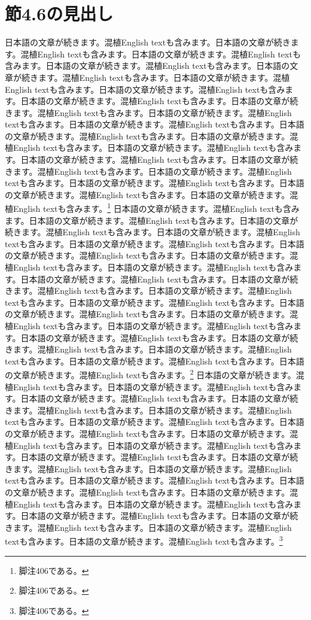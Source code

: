 \documentclass[pdflatex,book]{jlreq}
\begin{document}
\section{節4.6の見出し}
日本語の文章が続きます。混植English textも含みます。日本語の文章が続きます。混植English textも含みます。日本語の文章が続きます。混植English textも含みます。日本語の文章が続きます。混植English textも含みます。日本語の文章が続きます。混植English textも含みます。日本語の文章が続きます。混植English textも含みます。日本語の文章が続きます。混植English textも含みます。日本語の文章が続きます。混植English textも含みます。日本語の文章が続きます。混植English textも含みます。日本語の文章が続きます。混植English textも含みます。日本語の文章が続きます。混植English textも含みます。日本語の文章が続きます。混植English textも含みます。日本語の文章が続きます。混植English textも含みます。日本語の文章が続きます。混植English textも含みます。日本語の文章が続きます。混植English textも含みます。日本語の文章が続きます。混植English textも含みます。日本語の文章が続きます。混植English textも含みます。日本語の文章が続きます。混植English textも含みます。日本語の文章が続きます。混植English textも含みます。日本語の文章が続きます。混植English textも含みます。\footnote{脚注406である。}
日本語の文章が続きます。混植English textも含みます。日本語の文章が続きます。混植English textも含みます。日本語の文章が続きます。混植English textも含みます。日本語の文章が続きます。混植English textも含みます。日本語の文章が続きます。混植English textも含みます。日本語の文章が続きます。混植English textも含みます。日本語の文章が続きます。混植English textも含みます。日本語の文章が続きます。混植English textも含みます。日本語の文章が続きます。混植English textも含みます。日本語の文章が続きます。混植English textも含みます。日本語の文章が続きます。混植English textも含みます。日本語の文章が続きます。混植English textも含みます。日本語の文章が続きます。混植English textも含みます。日本語の文章が続きます。混植English textも含みます。日本語の文章が続きます。混植English textも含みます。日本語の文章が続きます。混植English textも含みます。日本語の文章が続きます。混植English textも含みます。日本語の文章が続きます。混植English textも含みます。日本語の文章が続きます。混植English textも含みます。日本語の文章が続きます。混植English textも含みます。\footnote{脚注406である。}
日本語の文章が続きます。混植English textも含みます。日本語の文章が続きます。混植English textも含みます。日本語の文章が続きます。混植English textも含みます。日本語の文章が続きます。混植English textも含みます。日本語の文章が続きます。混植English textも含みます。日本語の文章が続きます。混植English textも含みます。日本語の文章が続きます。混植English textも含みます。日本語の文章が続きます。混植English textも含みます。日本語の文章が続きます。混植English textも含みます。日本語の文章が続きます。混植English textも含みます。日本語の文章が続きます。混植English textも含みます。日本語の文章が続きます。混植English textも含みます。日本語の文章が続きます。混植English textも含みます。日本語の文章が続きます。混植English textも含みます。日本語の文章が続きます。混植English textも含みます。日本語の文章が続きます。混植English textも含みます。日本語の文章が続きます。混植English textも含みます。日本語の文章が続きます。混植English textも含みます。日本語の文章が続きます。混植English textも含みます。日本語の文章が続きます。混植English textも含みます。\footnote{脚注406である。}
\end{document}

